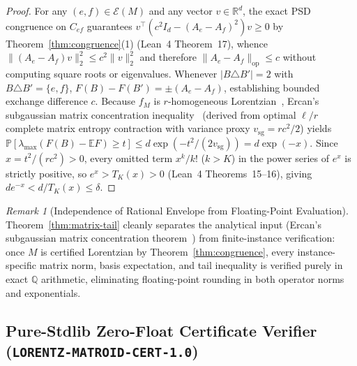 \documentclass[11pt,a4paper]{article}
\theoremstyle{definition}
\theoremstyle{remark}
\newtheorem{remark}[theorem]{Remark}
\newcommand{\QQ}{\mathbb{Q}}
\newcommand{\RR}{\mathbb{R}}
\newcommand{\certschema}{\texttt{LORENTZ-MATROID-CERT-1.0}}
\begin{document}
\begin{proof}
For any $(e, f) \in \mathcal{E}(M)$ and any vector $v \in \RR^d$, the exact PSD congruence on $C_{ef}$ guarantees $v^\top (c^2 I_d - (A_e - A_f)^2) v \ge 0$ by Theorem~\ref{thm:congruence}(1) (Lean~4 Theorem~17), whence $\|(A_e - A_f)v\|_2^2 \le c^2 \|v\|_2^2$ and therefore $\|A_e - A_f\|_{\mathrm{op}} \le c$ without computing square roots or eigenvalues. Whenever $|B \triangle B'| = 2$ with $B \triangle B' = \{e, f\}$, $F(B) - F(B') = \pm(A_e - A_f)$, establishing bounded exchange difference $c$. Because $f_M$ is $r$-homogeneous Lorentzian~\cite{branden2020lorentzian}, Ercan's subgaussian matrix concentration inequality~\cite{ercan2026lorentzian} (derived from optimal $\ell/r$ complete matrix entropy contraction with variance proxy $v_{\mathrm{sg}} = r c^2 / 2$) yields $\mathbb{P}[\lambda_{\max}(F(B)-\mathbb{E}F) \ge t] \le d\exp(-t^2/(2 v_{\mathrm{sg}})) = d\exp(-x)$. Since $x = t^2/(rc^2) > 0$, every omitted term $x^k/k!$ ($k > K$) in the power series of $e^x$ is strictly positive, so $e^x > T_K(x) > 0$ (Lean~4 Theorems~15--16), giving $d e^{-x} < d/T_K(x) \le \delta$.
\end{proof}

\begin{remark}[Independence of Rational Envelope from Floating-Point Evaluation]
Theorem~\ref{thm:matrix-tail} cleanly separates the analytical input (Ercan's subgaussian matrix concentration theorem~\cite{ercan2026lorentzian}) from finite-instance verification: once $M$ is certified Lorentzian by Theorem~\ref{thm:congruence}, every instance-specific matrix norm, basis expectation, and tail inequality is verified purely in exact $\QQ$ arithmetic, eliminating floating-point rounding in both operator norms and exponentials.
\end{remark}

\subsection{Pure-Stdlib Zero-Float Certificate Verifier (\certschema{})}
\end{document}
